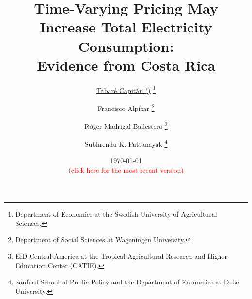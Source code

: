 \title{\vspace{-2cm}
      \normalsize{\textbf{Time-Varying Pricing May Increase Total Electricity Consumption: \\ Evidence from Costa Rica}}
      }

\author{

    \small{\href{www.TabareCapitan.com}{Tabaré Capitán (\Letter)}}
        \thanks{
           Department of Economics at the Swedish University of Agricultural Sciences.
        }

  \and
    \small{Francisco Alpízar}
        \thanks{
          Department of Social Sciences at Wageningen University.
        }

  \and
    \small{Róger Madrigal-Ballestero}
        \thanks{
          EfD‐Central America at the Tropical Agricultural Research and Higher Education Center (CATIE).
        }

  \and
    \small{Subhrendu K. Pattanayak}
        \thanks{
          Sanford School of Public Policy and the Department of Economics at Duke University.
        }
}


\date{
  \vspace{0.2cm}
  \footnotesize{\today}
  \\
  \href{https://osf.io/preprints/socarxiv/wcz8s/}
  {\footnotesize{\textcolor{red}{(click here for the most recent version)}}}
}

\maketitle

\thispagestyle{empty}   %

